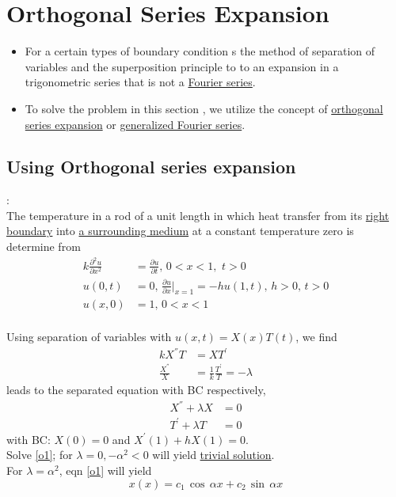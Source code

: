 \chapter{Orthogonal Series Expansion}
\begin{itemize}
\item For a certain types of boundary condition s the method of separation of variables  and  the superposition  principle to to an expansion in a trigonometric series that is not a \underline{Fourier series}.
\item To solve the problem in this section , we utilize the concept of \underline{orthogonal series expansion} or \underline{generalized Fourier series}.
\end{itemize}

\section{Using Orthogonal series expansion}
: \\
The temperature in a rod of a unit length in which heat transfer from its \underline{right boundary} into \underline{a surrounding medium} at a constant temperature zero is determine from
\begin{align*}
k\frac{\partial^2 u}{\partial x^2}&=\frac{\partial u}{\partial t},\,0<x<1,\,\,t>0\\
u(0,t)&=0,\,\frac{\partial u}{\partial x}\big|_{x=1}=-hu(1,t),\,h>0,\,t>0\\
u(x,0)&=1,\,0<x<1
\end{align*}
\\
Using separation of variables with $u(x,t)=X(x)T(t)$, we find
\begin{align*}
kX^{''}T&=XT^{'}\\
\frac{X^{''}}{X}&=\frac{1}{k}\frac{T^{'}}{T}=-\lambda
\end{align*}
leads to the separated equation with BC respectively,
\begin{align}
X^{''}+\lambda X&=0\label{o1}\\
T^{'}+\lambda T&=0\label{o2}
\end{align}
with BC: $X(0)=0$ and $X^{'}(1)+hX(1)=0$.\\
Solve \eqref{o1}; for $\lambda=0, -\alpha^2<0$ will yield \underline{trivial solution}.\\
For $\lambda=\alpha^2$, eqn \eqref{o1} will yield
\begin{equation}
x(x)=c_1\,\cos\,\alpha x+c_2\,\sin\,\alpha x\label{o3}
\end{equation}
